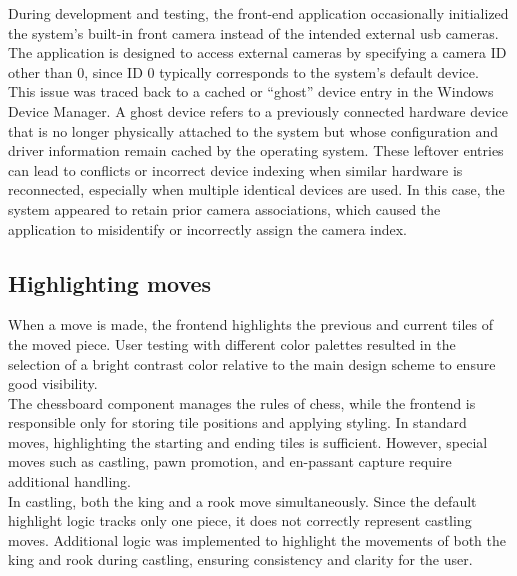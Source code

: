 During development and testing, the front-end application occasionally initialized the system’s built-in front camera instead of the intended external \gls{usb} cameras. The application is designed to access external cameras by specifying a camera ID other than 0, since ID 0 typically corresponds to the system’s default device. \\

This issue was traced back to a cached or “ghost” device entry in the Windows Device Manager. A ghost device refers to a previously connected hardware device that is no longer physically attached to the system but whose configuration and driver information remain cached by the operating system. These leftover entries can lead to conflicts or incorrect device indexing when similar hardware is reconnected, especially when multiple identical devices are used. In this case, the system appeared to retain prior camera associations, which caused the application to misidentify or incorrectly assign the camera index. \\

\subsection{Highlighting moves}
When a move is made, the frontend highlights the previous and current tiles of the moved piece. User testing with different color palettes resulted in the selection of a bright contrast color relative to the main design scheme to ensure good visibility. \\

The chessboard component manages the rules of chess, while the frontend is responsible only for storing tile positions and applying styling. In standard moves, highlighting the starting and ending tiles is sufficient. However, special moves such as \gls{castling}, pawn \gls{promotion}, and \gls{en-passant} capture require additional handling. \\

In \gls{castling}, both the king and a rook move simultaneously. Since the default highlight logic tracks only one piece, it does not correctly represent \gls{castling} moves. Additional logic was implemented to highlight the movements of both the king and rook during \gls{castling}, ensuring consistency and clarity for the user.






